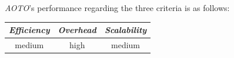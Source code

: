 %
\emph{AOTO}'s performance regarding the three criteria is as follows:
\begin{center}
{\footnotesize
\begin{tabular}{ccc}
\emph{Efficiency} & \emph{Overhead} & \emph{Scalability} \\
\hline
%
medium &
high &
medium
\end{tabular}
}
\end{center}

